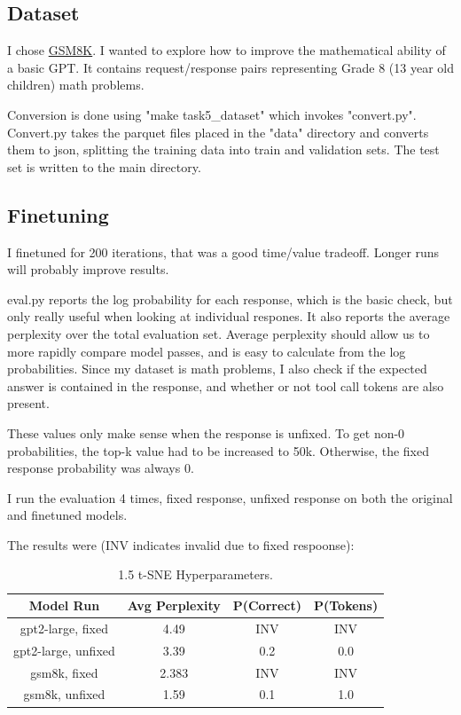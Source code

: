 \documentclass[11pt]{article}
\begin{document}
\subsection{Dataset}

I chose \href{https://huggingface.co/datasets/openai/gsm8k}{GSM8K}. I wanted to explore how to improve the mathematical ability of a basic GPT. It contains request/response pairs representing Grade 8 (13 year old children) math problems.

Conversion is done using "make task5\_dataset" which invokes "convert.py". Convert.py takes the parquet files placed in the "data" directory and converts them to json, splitting the training data into train and validation sets. The test set is written to the main directory.

\subsection{Finetuning}

I finetuned for 200 iterations, that was a good time/value tradeoff. Longer runs will probably improve results.

eval.py reports the log probability for each response, which is the basic check, but only really useful when looking at individual respones. It also reports the average perplexity over the total evaluation set. Average perplexity should allow us to more rapidly compare model passes, and is easy to calculate from the log probabilities. Since my dataset is math problems, I also check if the expected answer is contained in the response, and whether or not tool call tokens are also present.

These values only make sense when the response is unfixed. To get non-0 probabilities, the top-k value had to be increased to 50k. Otherwise, the fixed response probability was always 0.

I run the evaluation 4 times, fixed response, unfixed response on both the original and finetuned models.

The results were (INV indicates invalid due to fixed respoonse):

\begin{table}[H]
	\centering
	\begin{tabular}{ | c | c | c | c |  }
		\hline
		\textbf{Model Run} & \textbf{Avg Perplexity} & \textbf{P(Correct)} & \textbf{P(Tokens)} \\
		\hline
		gpt2-large, fixed & 4.49 & INV & INV \\
		\hline
		gpt2-large, unfixed & 3.39 & 0.2 & 0.0 \\
		\hline
		gsm8k, fixed & 2.383 & INV & INV \\
		\hline
		gsm8k, unfixed & 1.59 & 0.1 & 1.0 \\
		\hline
	\end{tabular}
	\caption{1.5 t-SNE Hyperparameters.}
\end{table}
\end{document}
